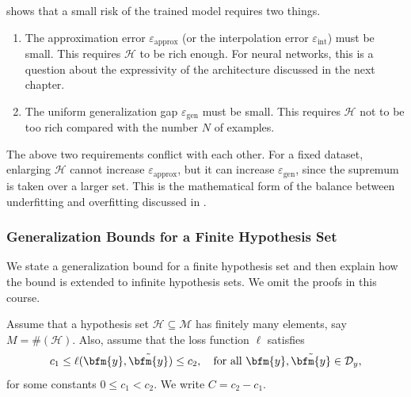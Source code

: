 \begin{remark}\label{under.over.fitting.interpretation.rem}

 shows that a small risk of the trained model requires two things.
\begin{enumerate}
\item The approximation error $\varepsilon_\text{approx}$ (or the interpolation error $\varepsilon_\text{int}$) must be small.  This requires $\mathcal{H}$ to be rich enough.  For neural networks, this is a question about the expressivity of the architecture discussed in the next chapter.
\item The uniform generalization gap $\varepsilon_\text{gen}$ must be small.  This requires $\mathcal{H}$ not to be too rich compared with the number $N$ of examples.
\end{enumerate}
The above two requirements conflict with each other.  For a fixed dataset, enlarging $\mathcal{H}$ cannot increase $\varepsilon_\text{approx}$, but it can increase $\varepsilon_\text{gen}$, since the supremum is taken over a larger set.  This is the mathematical form of the balance between underfitting and overfitting discussed in .

\end{remark}
\subsubsection{Generalization Bounds for a Finite Hypothesis Set}\label{generalization.bounds.summary.subs}
We state a generalization bound for a finite hypothesis set and then explain how the bound is extended to infinite hypothesis sets.  We omit the proofs in this course.

Assume that a hypothesis set $\mathcal{H}\subseteq\mathcal{M}$ has finitely many elements, say $M=\#(\mathcal{H})$.
Also, assume that the loss function $\ell$ satisfies
$$
c_1 \le \ell(\bfm{y},\tilde{\bfm{y}}) \le c_2, \quad\text{for all}~\bfm{y},\tilde{\bfm{y}}\in\mathcal{D}_y,
$$
for some constants $0\le c_1 < c_2$.  We write $C = c_2-c_1$.\medskip

